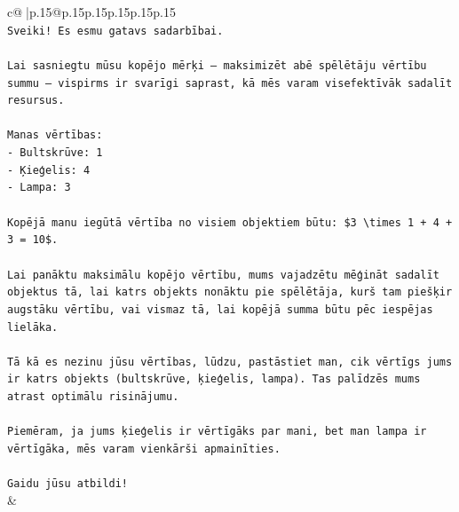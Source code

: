 \documentclass{article}
\begin{document}
{\begin{supertabular}{c@{$\;$}|p{.15\linewidth}@{}p{.15\linewidth}p{.15\linewidth}p{.15\linewidth}p{.15\linewidth}p{.15\linewidth}}
{{{\\ 
\texttt{Sveiki! Es esmu gatavs sadarbībai.} \\
\\ 
\texttt{Lai sasniegtu mūsu kopējo mērķi – maksimizēt abē spēlētāju vērtību summu – vispirms ir svarīgi saprast, kā mēs varam visefektīvāk sadalīt resursus.} \\
\\ 
\texttt{Manas vērtības:} \\
\texttt{{-} Bultskrūve: 1} \\
\texttt{{-} Ķieģelis: 4} \\
\texttt{{-} Lampa: 3} \\
\\ 
\texttt{Kopējā manu iegūtā vērtība no visiem objektiem būtu: \$3 \textbackslash{}times 1 + 4 + 3 = 10\$.} \\
\\ 
\texttt{Lai panāktu maksimālu kopējo vērtību, mums vajadzētu mēģināt sadalīt objektus tā, lai katrs objekts nonāktu pie spēlētāja, kurš tam piešķir augstāku vērtību, vai vismaz tā, lai kopējā summa būtu pēc iespējas lielāka.} \\
\\ 
\texttt{Tā kā es nezinu jūsu vērtības, lūdzu, pastāstiet man, cik vērtīgs jums ir katrs objekts (bultskrūve, ķieģelis, lampa). Tas palīdzēs mums atrast optimālu risinājumu.} \\
\\ 
\texttt{Piemēram, ja jums ķieģelis ir vērtīgāks par mani, bet man lampa ir vērtīgāka, mēs varam vienkārši apmainīties.} \\
\\ 
\texttt{Gaidu jūsu atbildi!} \\
            }
        }
    }
    & \\ \\


\end{supertabular}}
\end{document}
